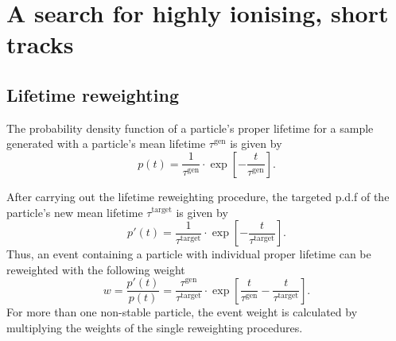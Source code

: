 \chapter{A search for highly ionising, short tracks}
\section{Lifetime reweighting}
\label{app:LifetimeReweighting}
The probability density function of a particle's proper lifetime for a sample generated with a particle's mean lifetime $\tau^{\text{gen}}$ is given by
\begin{equation*}
p \left( t \right) = \frac{1}{\tau^{\text{gen}}} \cdot \exp\left[ -\frac{t}{\tau^{\text{gen}}} \right].
\end{equation*}

After carrying out the lifetime reweighting procedure, the targeted p.d.f of the particle's new mean lifetime $\tau^{\text{target}}$ is given by
\begin{equation*}
p'  \left( t \right) = \frac{1}{\tau^{\text{target}}} \cdot \exp\left[ -\frac{t}{\tau^{\text{target}}} \right].
\end{equation*}
Thus, an event containing a particle with individual proper lifetime can be reweighted with the following weight
\begin{equation*}
\label{eq:reweight}
w = \frac{p'  \left( t \right)}{p \left( t \right)} = \frac{\tau^{\text{gen}}}{\tau^{\text{target}}} \cdot \exp\left[ \frac{t}{\tau^{\text{gen}}} - \frac{t}{\tau^{\text{target}}} \right].  %
\end{equation*}
For more than one non-stable particle, the event weight is calculated by multiplying the weights of the single reweighting procedures.

\clearpage
